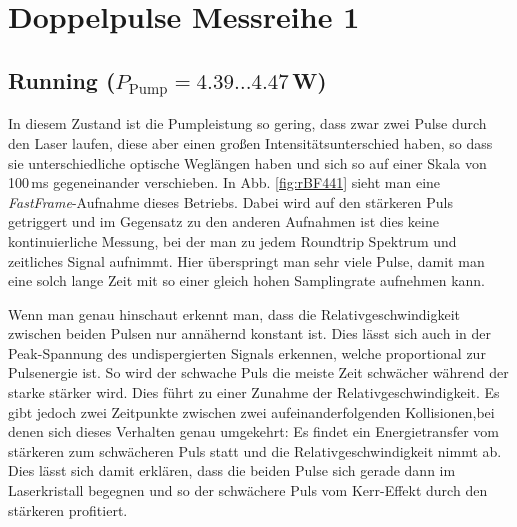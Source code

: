 \documentclass[bachelor,       %
               twoside,        %
               BCOR10mm,       %
               english,ngerman, %
               ]{GAUBM}
\begin{document}
\section{Doppelpulse Messreihe 1}
\subsection{Running ($P_\text{Pump}=4.39\dots4.47\,$W)}
In diesem Zustand ist die Pumpleistung so gering, dass zwar zwei Pulse durch den Laser laufen, diese aber einen großen Intensitätsunterschied haben, so dass sie unterschiedliche optische Weglängen haben und sich so auf einer Skala von 100\,ms gegeneinander verschieben.
In Abb. \ref{fig:rBF441} sieht man eine \textit{FastFrame}-Aufnahme dieses Betriebs.
Dabei wird auf den stärkeren Puls getriggert und im Gegensatz zu den anderen Aufnahmen ist dies keine kontinuierliche Messung, bei der man zu jedem Roundtrip Spektrum und zeitliches Signal aufnimmt.
Hier überspringt man sehr viele Pulse, damit man eine solch lange Zeit mit so einer gleich hohen Samplingrate aufnehmen kann.

Wenn man genau hinschaut erkennt man, dass die Relativgeschwindigkeit zwischen beiden Pulsen nur annähernd konstant ist.
Dies lässt sich auch in der Peak-Spannung des undispergierten Signals erkennen, welche proportional zur Pulsenergie ist.
So wird der schwache Puls die meiste Zeit schwächer während der starke stärker wird.
Dies führt zu einer Zunahme der Relativgeschwindigkeit.
Es gibt jedoch zwei Zeitpunkte zwischen zwei aufeinanderfolgenden Kollisionen,bei denen sich dieses Verhalten genau umgekehrt: Es findet ein Energietransfer vom stärkeren zum schwächeren Puls statt und die Relativgeschwindigkeit nimmt ab.
Dies lässt sich damit erklären, dass die beiden Pulse sich gerade dann im Laserkristall begegnen und so der schwächere Puls vom Kerr-Effekt durch den stärkeren profitiert.
\end{document}
